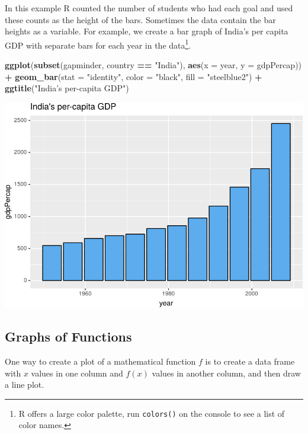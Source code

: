 \documentclass[]{krantz}
\makeatletter
\newenvironment{Shaded}{\begin{snugshade}}{\end{snugshade}}
\newcommand{\DataTypeTok}[1]{\textcolor[rgb]{0.27,0.27,0.27}{#1}}
\newcommand{\KeywordTok}[1]{\textcolor[rgb]{0.27,0.27,0.27}{\textbf{#1}}}
\newcommand{\NormalTok}[1]{#1}
\newcommand{\OperatorTok}[1]{\textcolor[rgb]{0.43,0.43,0.43}{\textbf{#1}}}
\newcommand{\StringTok}[1]{\textcolor[rgb]{0.5,0.5,0.5}{#1}}
\newenvironment{kframe}{%
\medskip{}
\setlength{\fboxsep}{.8em}
 \def\at@end@of@kframe{}%
 \ifinner\ifhmode%
  \def\at@end@of@kframe{\end{minipage}}%
  \begin{minipage}{\columnwidth}%
 \fi\fi%
 \def\FrameCommand##1{\hskip\@totalleftmargin \hskip-\fboxsep
 \colorbox{shadecolor}{##1}\hskip-\fboxsep
     \hskip-\linewidth \hskip-\@totalleftmargin \hskip\columnwidth}%
 \MakeFramed {\advance\hsize-\width
   \@totalleftmargin\z@ \linewidth\hsize
   \@setminipage}}%
 {\par\unskip\endMakeFramed%
 \at@end@of@kframe}
\renewenvironment{Shaded}{\begin{kframe}}{\end{kframe}}
\makeatother
\begin{document}
In this example R counted the number of students who had each goal and used these counts as the height of the bars. Sometimes the data contain the bar heights as a variable. For example, we create a bar graph of India's per capita GDP with separate bars for each year in the data\footnote{R offers a large color palette, run \texttt{colors()} on the console to see a list of color names.}.

\begin{Shaded}
\begin{Highlighting}[]
\KeywordTok{ggplot}\NormalTok{(}\KeywordTok{subset}\NormalTok{(gapminder, country }\OperatorTok{==}\StringTok{ "India"}\NormalTok{), }\KeywordTok{aes}\NormalTok{(}\DataTypeTok{x =}\NormalTok{ year, }\DataTypeTok{y =}\NormalTok{ gdpPercap)) }\OperatorTok{+}\StringTok{ }
\StringTok{    }\KeywordTok{geom_bar}\NormalTok{(}\DataTypeTok{stat =} \StringTok{"identity"}\NormalTok{, }\DataTypeTok{color =} \StringTok{"black"}\NormalTok{, }\DataTypeTok{fill =} \StringTok{"steelblue2"}\NormalTok{) }\OperatorTok{+}\StringTok{ }
\StringTok{    }\KeywordTok{ggtitle}\NormalTok{(}\StringTok{"India's per-capita GDP"}\NormalTok{)}
\end{Highlighting}
\end{Shaded}

\includegraphics{bookdown_files/figure-latex/unnamed-chunk-79-1.pdf}

\hypertarget{graphs-of-functions}{%
\subsection{Graphs of Functions}\label{graphs-of-functions}}

One way to create a plot of a mathematical function \(f\) is to create a data frame with \(x\) values in one column and \(f(x)\) values in another column, and then draw a line plot.
\end{document}
